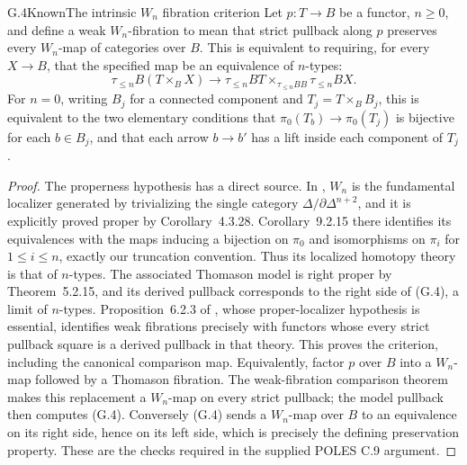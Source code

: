 \begin{statement}{G.4}{Known}{The intrinsic $W_n$ fibration criterion}
Let $p:T\to B$ be a functor, $n\geq0$, and define a weak
$W_n$-fibration to mean that strict pullback along $p$ preserves every
$W_n$-map of categories over $B$. This is equivalent to requiring, for
every $X\to B$, that the specified map be an equivalence of $n$-types:
\[
 \tau_{\leq n}B(T\times_BX)\longrightarrow
 \tau_{\leq n}BT
       \mathop{\times}_{\tau_{\leq n}BB}\tau_{\leq n}BX.
\tag{G.4}
\]
For $n=0$, writing $B_j$ for a connected component and
$T_j=T\times_BB_j$, this is equivalent to the two elementary conditions
that $\pi_0(T_b)\to\pi_0(T_j)$ is bijective for each $b\in B_j$, and
that each arrow $b\to b'$ has a lift inside each component of $T_j$.
\end{statement}
\begin{proof}
The properness hypothesis has a direct source. In
\citet[\S9.2.1, pp.~364--365]{E_Cisinski2006}, $W_n$ is the fundamental
localizer generated by trivializing the single category
$\Delta/\partial\Delta^{n+2}$, and it is explicitly proved proper by
Corollary~4.3.28. Corollary~9.2.15 there identifies its equivalences
with the maps inducing a bijection on $\pi_0$ and isomorphisms on
$\pi_i$ for $1\leq i\leq n$, exactly our truncation convention.
Thus its localized homotopy theory is that of $n$-types. The associated
Thomason model is right proper by Theorem~5.2.15, and its derived
pullback corresponds to the right side of (G.4), a limit of $n$-types.
Proposition~6.2.3 of \citet{E_Cisinski2006}, whose proper-localizer
hypothesis is essential, identifies weak fibrations precisely with
functors whose every strict pullback square is a derived pullback in
that theory. This proves the criterion, including the canonical
comparison map. Equivalently, factor $p$ over $B$ into a $W_n$-map
followed by a Thomason fibration. The weak-fibration comparison theorem
makes this replacement a $W_n$-map on every strict pullback; the model
pullback then computes (G.4). Conversely (G.4) sends a $W_n$-map over
$B$ to an equivalence on its right side, hence on its left side, which
is precisely the defining preservation property. These are the checks
required in the supplied POLES C.9 argument.


\end{proof}
